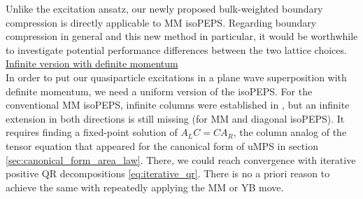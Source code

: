 \noindent Unlike the excitation ansatz, our newly proposed bulk-weighted boundary compression is directly applicable to MM isoPEPS. Regarding boundary compression in general and this new method in particular, it would be worthwhile to investigate potential performance differences between the two lattice choices. \\[1em]

\noindent \underline{Infinite version with definite momentum} \\[0.5em]
In order to put our quasiparticle excitations in a plane wave superposition with definite momentum, we need a uniform version of the isoPEPS. For the conventional MM isoPEPS, infinite columns were established in \cite{wu2023two}, but an infinite extension in both directions is still missing (for MM and diagonal isoPEPS). It requires finding a fixed-point solution of $A_L C = C A_R$, the column analog of the tensor equation that appeared for the canonical form of uMPS in section \ref{sec:canonical_form_area_law}. There, we could reach convergence with iterative positive QR decompositions \eqref{eq:iterative_qr}. There is no a priori reason to achieve the same with repeatedly applying the MM or YB move. \\[0.5em]

